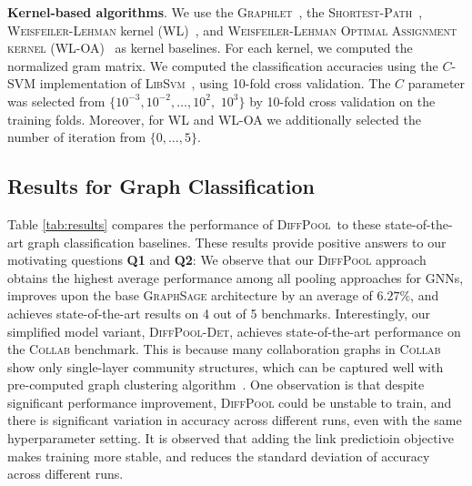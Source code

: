 \documentclass{article}
\newcommand{\xhdr}[1]{{\noindent\bfseries #1}.}
\newcommand{\name}{\textsc{DiffPool}\xspace}
\newcommand{\cut}[1]{}
\begin{document}
\xhdr{Kernel-based algorithms}
We use the \textsc{Graphlet}~\cite{She+2009}, the \textsc{Shortest-Path}~\cite{Borgwardt2005}, \textsc{Weisfeiler-Lehman} kernel (\textsc{WL})~\cite{She+2011}, and \textsc{Weisfeiler-Lehman Optimal Assignment kernel} (\textsc{WL-OA})~\cite{kriege2016valid} as kernel baselines. For each kernel, we computed the normalized gram matrix. We computed the classification accuracies using the $C$-SVM implementation of \textsc{LibSvm}~\cite{Cha+11}, using 10-fold cross validation. The $C$ parameter was selected from $\{10^{-3}, 10^{-2}, \dotsc, 10^{2},$ $10^{3}\}$ by 10-fold cross validation on the training folds. Moreover, for \textsc{WL} and \textsc{WL-OA} we additionally selected the number of iteration from $\{0, \dots, 5\}$.

\subsection{Results for Graph Classification}\label{sec:classification}
Table \ref{tab:results} compares the performance of \name\ to these state-of-the-art graph classification baselines.
These results provide positive answers to our motivating questions {\bf Q1} and {\bf Q2}:
We observe that our \name approach obtains the highest average performance among all pooling approaches for GNNs, improves upon the base \textsc{GraphSage} architecture by an average of $6.27\%$, and achieves state-of-the-art results on 4 out of 5 benchmarks. Interestingly, our simplified model variant, \textsc{\name-Det}, achieves state-of-the-art performance on the \textsc{Collab} benchmark. This is because many collaboration graphs in \textsc{Collab} show only single-layer community structures, which can be captured well with pre-computed graph clustering algorithm~\cite{dhillon2007weighted}.
One observation is that despite significant performance improvement, \name could be unstable to train, and there is significant variation in accuracy across different runs, even with the same hyperparameter setting. It is observed that adding the link predictioin objective makes training more stable, and reduces the standard deviation of accuracy across different runs.
\cut{
Among the baseline methods, the kernel-based \textsc{WL-OA} also performs quite well, achieving the second-best accuracy on the \textsc{Collab} benchmark, which contains exceptionally dense graphs. 
applied on top of \textsc{GraphSage} with GNNs using other pooling methods, as well as kernel-based methods. In the last column we report the percentage gain of each GNN pooling baseline over \textsc{GraphSage} with naive mean pooling.
\textsc{Set2Set} aggregation has shown to give significant gains in many data sets, achieving an average of $3.23\%$ improvement compared to the naive baseline of \textsc{GraphSage} with global pooling. However, \textsc{Set2Set} aggregation has longer running time: it runs $12$ times slower than \name on average.
In comparison, \textsc{PatchySan}, \textsc{SortPool} and \textsc{ClusterPool}  all achieve better results, due to their ability to pool according to structures of the graphs. 
}
\end{document}

